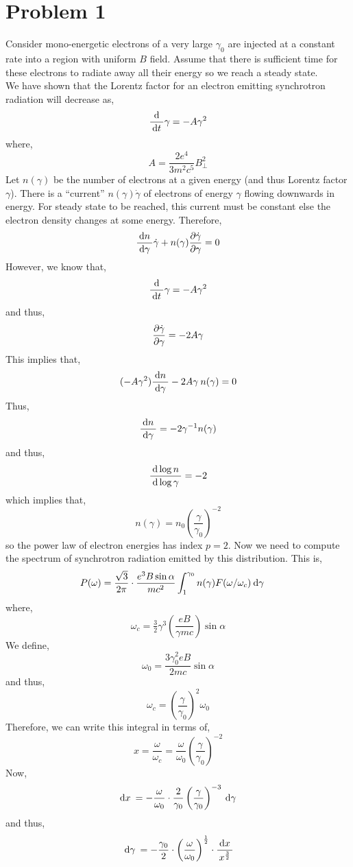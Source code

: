 \documentclass[12pt]{article}
\begin{document}

\section{Problem 1}

Consider mono-energetic electrons of a very large $\gamma_0$ are injected at a constant rate into a region with uniform $B$ field. Assume that there is sufficient time for these electrons to radiate away all their energy so we reach a steady state. 
\bigskip\\
We have shown that the Lorentz factor for an electron emitting synchrotron radiation will decrease as,
\[ \frac{\: \mathrm{d} \:}{\: \mathrm{d}t \:} \gamma = - A \gamma^2 \]
where,
\[ A = \frac{2 e^4}{3 m^2 c^5} B_\perp^2 \]
Let $n(\gamma)$ be the number of electrons at a given energy (and thus Lorentz factor $\gamma$). There is a ``current'' $n(\gamma) \dot{\gamma}$ of electrons of energy $\gamma$ flowing downwards in energy. For steady state to be reached, this current must be constant else the electron density changes at some energy. Therefore,
\[ \frac{\: \mathrm{d}n \:}{\: \mathrm{d}\gamma \:} \dot{\gamma} + n(\gamma) \frac{\partial{\dot{\gamma}}}{\partial{\gamma}} = 0 \]
However, we know that,
\[ \frac{\: \mathrm{d} \:}{\: \mathrm{d}t \:} \gamma = - A \gamma^2 \]
and thus,
\[ \frac{\partial{\dot{\gamma}}}{\partial{\gamma}} = - 2 A \gamma \]
This implies that,
\[ (- A \gamma^2) \frac{\: \mathrm{d}n \:}{\: \mathrm{d}\gamma \:} - 2 A \gamma \: n(\gamma)  = 0 \]
Thus,
\[ \frac{\: \mathrm{d}n \:}{\: \mathrm{d}\gamma \:} = - 2 \gamma^{-1} n(\gamma) \]
and thus,
\[ \frac{\: \mathrm{d}\log{n} \:}{\: \mathrm{d}\log{\gamma} \:} = - 2 \]
which implies that,
\[ n(\gamma) = n_0 \left( \frac{\gamma}{\gamma_0} \right)^{-2} \]
so the power law of electron energies has index $p = 2$. Now we need to compute the spectrum of synchrotron radiation emitted by this distribution. This is,
\begin{align*}
P(\omega) & = \frac{\sqrt{3}}{2 \pi} \cdot \frac{e^3 B \sin{\alpha}}{m c^2} \int_{1}^{\gamma_0} n(\gamma) F(\omega / \omega_c) \: \mathrm{d}\gamma \:  
\end{align*}
where,
\[ \omega_c = \tfrac{3}{2} \gamma^3 \left( \frac{e B}{\gamma m c} \right) \sin{\alpha} \]
We define,
\[ \omega_0 = \frac{3 \gamma_0^2 e B}{2 m c} \sin{\alpha} \]
and thus,
\[ \omega_c = \left( \frac{\gamma}{\gamma_0} \right)^2 \omega_0 \]
Therefore, we can write this integral in terms of,
\[ x = \frac{\omega}{\omega_c} = \frac{\omega}{\omega_0} \left( \frac{\gamma}{\gamma_0} \right)^{-2} \]
Now,
\[ \: \mathrm{d}x \: = - \frac{\omega}{\omega_0} \cdot \frac{2}{\gamma_0} \left( \frac{\gamma}{\gamma_0} \right)^{-3} \: \mathrm{d}\gamma \: \]
and thus,
\[ \: \mathrm{d}\gamma \: = - \frac{\gamma_0}{2} \cdot \left( \frac{\omega}{\omega_0} \right)^{\frac{1}{2}} \cdot \frac{\: \mathrm{d}x \:}{x^{\frac{3}{2}}} \]
\end{document}
